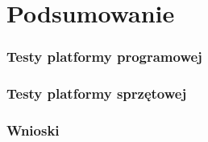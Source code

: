 \newpage
\part{Podsumowanie}
\section{Testy platformy programowej}
\section{Testy platformy sprzętowej}
\section{Wnioski}